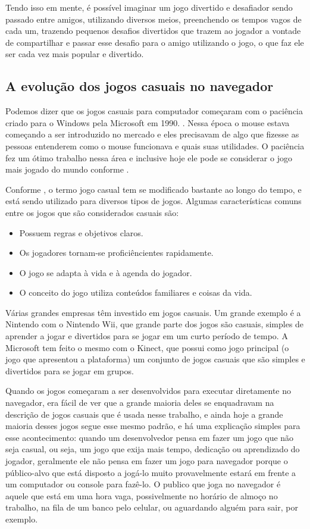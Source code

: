 Tendo isso em mente, é possível imaginar um jogo divertido e desafiador
sendo passado entre amigos, utilizando diversos meios, preenchendo os
tempos vagos de cada um, trazendo pequenos desafios divertidos que
trazem ao jogador a vontade de compartilhar e passar esse desafio para
o amigo utilizando o jogo, o que faz ele ser cada vez mais popular e
divertido.

\subsection{A evolução dos jogos casuais no navegador}

Podemos dizer que os jogos casuais para computador começaram com
o paciência criado para o Windows pela Microsoft em 1990. \cite{trefry2010casual}.
Nessa época o mouse estava começando a ser introduzido no mercado e
eles precisavam de algo que fizesse as pessoas entenderem como o mouse
funcionava e quais suas utilidades. O paciência fez um ótimo trabalho
nessa área e inclusive hoje ele pode se considerar o jogo mais jogado
do mundo conforme .

Conforme , o termo jogo casual tem se
modificado bastante ao longo do tempo, e está sendo utilizado para
diversos tipos de jogos. Algumas características comuns entre os jogos
que são considerados casuais são:

\begin{itemize}
    \item Possuem regras e objetivos claros.
    \item Os jogadores tornam-se proficiêncientes rapidamente.
    \item O jogo se adapta à vida e à agenda do jogador.
    \item O conceito do jogo utiliza conteúdos familiares e coisas da vida.
\end{itemize}

Várias grandes empresas têm investido em jogos casuais. Um grande
exemplo é a Nintendo com o Nintendo Wii, que grande parte dos jogos
são casuais, simples de aprender a jogar e divertidos para se jogar
em um curto período de tempo.
A Microsoft tem feito o mesmo com o Kinect, que
possui como jogo principal (o jogo que apresentou a plataforma) um
conjunto de jogos casuais que são simples e divertidos para se jogar
em grupos.

Quando os jogos começaram a ser desenvolvidos para executar
diretamente no navegador, era fácil de ver que a grande maioria deles
se enquadravam na descrição de jogos casuais que é usada nesse
trabalho, e ainda hoje a grande maioria desses jogos segue
esse mesmo padrão, e há uma explicação simples para esse
acontecimento: quando um desenvolvedor pensa em fazer um jogo que
não seja casual, ou seja, um jogo que exija mais tempo, dedicação ou
aprendizado do jogador, geralmente ele não pensa em fazer um jogo para
navegador porque o público-alvo que está disposto a jogá-lo muito
provavelmente estará em frente a um computador ou console para
fazê-lo.
O publico que joga no navegador é aquele que está em uma hora
vaga, possivelmente no horário de almoço no trabalho, na fila de um
banco pelo celular, ou aguardando alguém para sair, por exemplo.

